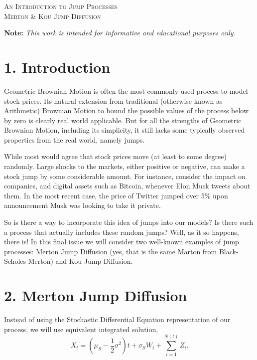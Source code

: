 \documentclass[11pt]{article}
\begin{document}

\begin{tcolorbox}
\begin{center}
    \large
    \textsc{An Introduction to Jump Processes \\ Merton \& Kou Jump Diffusion}
\end{center}
\end{tcolorbox}

\begin{center}
\textbf{Note:} \textit{This work is intended for informative and educational purposes only.}
\end{center}

\section*{1. Introduction}
Geometric Brownian Motion is often the most commonly used process to model stock prices. Its natural extension from traditional (otherwise known as Arithmetic) Brownian Motion to bound the possible values of the process below by zero is clearly real world applicable. But for all the strengths of Geometric Brownian Motion, including its simplicity, it still lacks some typically observed properties from the real world, namely jumps. 

While most would agree that stock prices move (at least to some degree) randomly. Large shocks to the markets, either positive or negative, can make a stock jump by some considerable amount. For instance, consider the impact on companies, and digital assets such as Bitcoin, whenever Elon Musk tweets about them. In the most recent case, the price of Twitter jumped over 5\% upon announcement Musk was looking to take it private. 

So is there a way to incorporate this idea of jumps into our models? Is there such a process that actually includes these random jumps? Well, as it so happens, there is! In this final issue we will consider two well-known examples of jump processes: Merton Jump Diffusion (yes, that is the same Marton from Black-Scholes Merton) and Kou Jump Diffusion. 

\section*{2. Merton Jump Diffusion}
Instead of using the Stochastic Differential Equation representation of our process, we will use equivalent integrated solution,
\begin{equation}
    X_t = (\mu_S - \frac{1}{2} \sigma^2)t + \sigma_S W_t + \sum_{i=1}^{N(t)} Z_i.
\end{equation}
\end{document}
